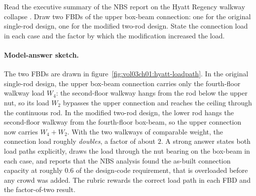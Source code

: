 \begin{exercise}
Read the executive summary of the NBS report on the Hyatt Regency
walkway collapse \cite{acc:nbs-hyatt-1982}. Draw two FBDs of the
upper box-beam connection: one for the original single-rod design,
one for the modified two-rod design. State the connection load in
each case and the factor by which the modification increased the
load.
\paragraph{Model-answer sketch.} The two FBDs are drawn in
figure~\ref{fig:vol03ch01:hyatt-loadpath}. In the original single-rod
design, the upper box-beam connection carries only the fourth-floor
walkway load $W_4$: the second-floor walkway hangs from the rod below
the upper nut, so its load $W_2$ bypasses the upper connection and
reaches the ceiling through the continuous rod. In the modified two-rod
design, the lower rod hangs the second-floor walkway from the
fourth-floor box-beam, so the upper connection now carries $W_4 + W_2$.
With the two walkways of comparable weight, the connection load roughly
\emph{doubles}, a factor of about $2$. A strong answer states both load
paths explicitly, draws the load through the nut bearing on the box-beam
in each case, and reports that the NBS analysis found the as-built
connection capacity at roughly $0.6$ of the design-code requirement,
that is overloaded before any crowd was added. The rubric rewards the
correct load path in each FBD and the factor-of-two result.
\end{exercise}

